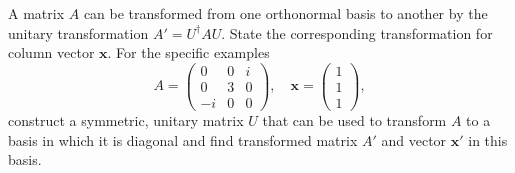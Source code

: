 \documentclass[a4paper,12pt]{report}
\begin{document}
{A matrix $A$ can be transformed from one orthonormal basis to another by the unitary transformation $A' = U^\dagger A U$. State the corresponding transformation for column vector $\mathbf{x}$. For the specific examples
$$ A = \begin{pmatrix} 0 & 0 & i \\ 0 & 3 & 0 \\ -i & 0 & 0 \end{pmatrix} , \quad \mathbf{x} = \begin{pmatrix} 1 \\ 1 \\ 1 \end{pmatrix} , $$
construct a symmetric, unitary matrix $U$ that can be used to transform $A$ to a basis in which it is diagonal and find transformed matrix $A'$ and vector $\mathbf{x}'$ in this basis.
}
\end{document}
